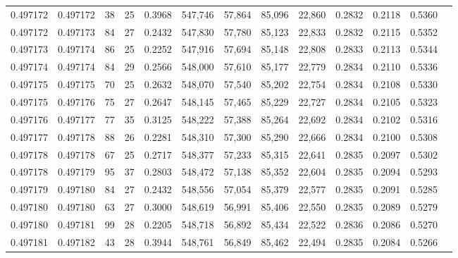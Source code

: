 \begin{tabular}{rrrrrrrrrrrrr}
0.497172 & 0.497172 &  38 &  25 &                                     0.3968 & 547,746 &  57,864 &  85,096 &  22,860 & 0.2832 & 0.2118 & 0.5360 \\
0.497172 & 0.497173 &  84 &  27 &                                     0.2432 & 547,830 &  57,780 &  85,123 &  22,833 & 0.2832 & 0.2115 & 0.5352 \\
0.497173 & 0.497174 &  86 &  25 &                                     0.2252 & 547,916 &  57,694 &  85,148 &  22,808 & 0.2833 & 0.2113 & 0.5344 \\
0.497174 & 0.497174 &  84 &  29 &                                     0.2566 & 548,000 &  57,610 &  85,177 &  22,779 & 0.2834 & 0.2110 & 0.5336 \\
0.497175 & 0.497175 &  70 &  25 &                                     0.2632 & 548,070 &  57,540 &  85,202 &  22,754 & 0.2834 & 0.2108 & 0.5330 \\
0.497175 & 0.497176 &  75 &  27 &                                     0.2647 & 548,145 &  57,465 &  85,229 &  22,727 & 0.2834 & 0.2105 & 0.5323 \\
0.497176 & 0.497177 &  77 &  35 &                                     0.3125 & 548,222 &  57,388 &  85,264 &  22,692 & 0.2834 & 0.2102 & 0.5316 \\
0.497177 & 0.497178 &  88 &  26 &                                     0.2281 & 548,310 &  57,300 &  85,290 &  22,666 & 0.2834 & 0.2100 & 0.5308 \\
0.497178 & 0.497178 &  67 &  25 &                                     0.2717 & 548,377 &  57,233 &  85,315 &  22,641 & 0.2835 & 0.2097 & 0.5302 \\
0.497178 & 0.497179 &  95 &  37 &                                     0.2803 & 548,472 &  57,138 &  85,352 &  22,604 & 0.2835 & 0.2094 & 0.5293 \\
0.497179 & 0.497180 &  84 &  27 &                                     0.2432 & 548,556 &  57,054 &  85,379 &  22,577 & 0.2835 & 0.2091 & 0.5285 \\
0.497180 & 0.497180 &  63 &  27 &                                     0.3000 & 548,619 &  56,991 &  85,406 &  22,550 & 0.2835 & 0.2089 & 0.5279 \\
0.497180 & 0.497181 &  99 &  28 &                                     0.2205 & 548,718 &  56,892 &  85,434 &  22,522 & 0.2836 & 0.2086 & 0.5270 \\
0.497181 & 0.497182 &  43 &  28 &                                     0.3944 & 548,761 &  56,849 &  85,462 &  22,494 & 0.2835 & 0.2084 & 0.5266 \\

\end{tabular}
